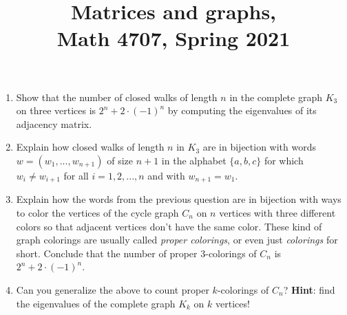 \documentclass[11pt]{article}
\title{Matrices and graphs, \\ Math 4707, Spring 2021}
\date{}
\begin{document}
\maketitle


\vspace{-0.5cm}

\begin{enumerate}
\item Show that the number of closed walks of length $n$ in the complete graph $K_3$ on three vertices is $2^n+2\cdot(-1)^n$ by computing the eigenvalues of its adjacency matrix.
\item Explain how closed walks of length $n$ in $K_3$ are in bijection with words $w=(w_1,...,w_{n+1})$ of size $n+1$ in the alphabet $\{a,b,c\}$ for which $w_{i} \neq w_{i+1}$ for all $i=1,2,...,n$ and with $w_{n+1}=w_1$.
\item Explain how the words from the previous question are in bijection with ways to color the vertices of the cycle graph $C_n$ on $n$ vertices with three different colors so that adjacent vertices don't have the same color. These kind of graph colorings are usually called \emph{proper colorings}, or even just \emph{colorings} for short. Conclude that the number of proper 3-colorings of $C_n$ is $2^n+2\cdot(-1)^n$. 
\item Can you generalize the above to count proper $k$-colorings of $C_n$? {\bf Hint}: find the eigenvalues of the complete graph $K_k$ on $k$ vertices!
\end{enumerate}

\pagebreak
\end{document}
